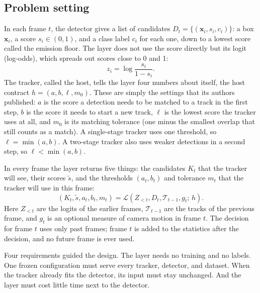 \documentclass[pdflatex,sn-mathphys-num,iicol]{sn-jnl}
\begin{document}
\subsection{Problem setting}\label{sec:problem}
In each frame $t$, the detector gives a list of candidates
$D_t=\{(\mathbf{x}_i,s_i,c_i)\}$: a box $\mathbf{x}_i$, a score
$s_i\in(0,1)$, and a class label $c_i$ for each one, down to a lowest score
called the emission floor. The layer does not use the score directly but its
logit (log-odds), which spreads out scores close to 0 and 1:
\begin{equation}
z_i=\log\frac{s_i}{1-s_i}.
\label{eq:logit}
\end{equation}
The tracker, called the host, tells the layer four numbers about itself,
the host contract $h=(a,b,\ell,m_0)$. These are simply the settings that its
authors published: $a$ is the score a detection needs to be matched to a
track in the first step, $b$ is the score it needs to start a new track,
$\ell$ is the lowest score the tracker uses at all, and $m_0$ is its matching
tolerance (one minus the smallest overlap that still counts as a match). A
single-stage tracker uses one threshold, so $\ell=\min(a,b)$. A two-stage
tracker also uses weaker detections in a second step, so
$\ell<\min(a,b)$.

In every frame the layer returns five things: the candidates $K_t$ that
the tracker will see, their scores $\tilde{s}$, and the thresholds
$(a_t,b_t)$ and tolerance $m_t$ that the tracker will use in this frame:
\begin{equation}
\left(K_t,\tilde{s},a_t,b_t,m_t\right)=
\mathcal{L}\left(Z_{<t},D_t,\mathcal{T}_{t-1},g_t;\,h\right).
\label{eq:layer}
\end{equation}
Here $Z_{<t}$ are the logits of the earlier frames, $\mathcal{T}_{t-1}$
are the tracks of the previous frame, and $g_t$ is an optional measure of
camera motion in frame $t$. The decision for frame $t$ uses only past
frames; frame $t$ is added to the statistics after the decision, and no
future frame is ever used.

Four requirements guided the design. The layer needs no training and no
labels. One frozen configuration must serve every tracker, detector, and
dataset. When the tracker already fits the detector, its input must stay
unchanged. And the layer must cost little time next to the detector.
\end{document}
